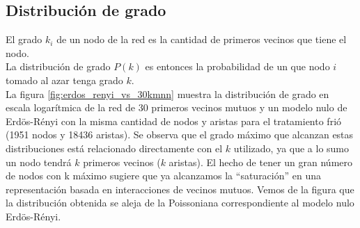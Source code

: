 \subsection*{Distribución de grado}
El grado $k_i$ de un nodo de la red es la cantidad de primeros vecinos que tiene el nodo.\\
La distribución de grado $P(k)$ es entonces la probabilidad de un que nodo $i$ tomado al azar tenga grado $k$.\\La figura \ref{fig:erdos_renyi_vs_30kmnn} muestra la distribución de grado en escala logarítmica de la red de 30 primeros vecinos mutuos y un modelo nulo de Erdös-Rényi con la misma cantidad de nodos y aristas para el tratamiento frió (1951 nodos y 18436 aristas). Se observa que el grado máximo que alcanzan estas distribuciones está relacionado directamente con el $k$ utilizado, ya que a lo sumo un nodo tendrá $k$ primeros vecinos ($k$ aristas). El hecho de tener un gran número de nodos con k máximo sugiere que ya alcanzamos la ``saturación'' en una representación basada en interacciones de vecinos mutuos. Vemos de la figura que la distribución obtenida se aleja de la Poissoniana correspondiente al modelo nulo Erdös-Rényi.
